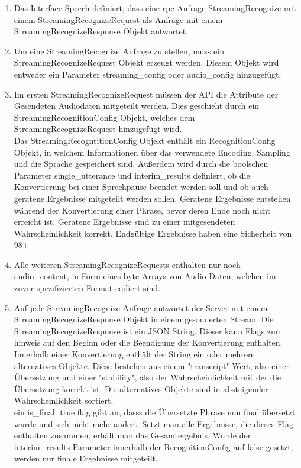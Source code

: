 \begin{enumerate}
	\item Das Interface Speech definiert, dass eine rpc Anfrage StreamingRecognize mit einem StreamingRecognizeRequest als Anfrage mit einem StreamingRecognizeResponse Objekt antwortet.
	\item Um eine StreamingRecognize Anfrage zu stellen, muss ein StreamingRecognizeRequest Objekt erzeugt werden. Diesem Objekt wird entweder ein Parameter streaming\_config oder audio\_config hinzugefügt.
	\item Im ersten StreamingRecognizeRequest müssen der API die Attribute der Gesendeten Audiodaten mitgeteilt werden. Dies geschieht durch ein StreamingRecognitionConfig Objekt, welches dem StreamingRecognizeRequest hinzugefügt wird.\\
	Das StreamingRecogntitionConfig Objekt enthält ein RecognitionConfig Objekt, in welchem Informationen über das verwendete Encoding, Sampling und die Sprache gespeichert sind. Außerdem wird durch die boolschen Parameter single\_utterance und interim\_results definiert, ob die Konvertierung bei einer Sprechpause beendet werden soll und ob auch geratene Ergebnisse mitgeteilt werden sollen. Geratene Ergebnisse entstehen während der Konvertierung einer Phrase, bevor deren Ende noch nicht erreicht ist. Geratene Ergebnisse sind zu einer mitgesendeten Wahrscheinlichkeit korrekt. Endgültige Ergebnisse haben eine Sicherheit von 98+ %
	\item Alle weiteren StreamingRecognizeRequests enthalten nur noch audio\_content, in Form eines byte Arrays von Audio Daten, welchen im zuvor spezifizierten Format codiert sind.
	\item Auf jede StreamingRecognize Anfrage antwortet der Server mit einem StreamingRecognizeResponse Objekt in einem gesonderten Stream. Die StreamingRecognizeResponse ist ein JSON String. Dieser kann Flags zum hinweis auf den Beginn oder die Beendigung der Konvertierung enthalten. Innerhalb einer Konvertierung enthält der String ein oder mehrere alternatives Objekte. Diese bestehen aus einem "transcript"-Wert, also einer Übersetzung und einer "stability", also der Wahrscheinlichkeit mit der die Übersetzung korrekt ist. Die alternatives Objekte sind in absteigender Wahrscheinlichkeit sortiert.\\
	ein is\_final: true flag gibt an, dasss die Übersetzte Phrase nun final übersetzt wurde und sich nicht mehr ändert. Setzt man alle Ergebnisse, die dieses Flag enthalten zusammen, erhält man das Gesamtergebnis. Wurde der interim\_results Parameter innerhalb der RecognitionConfig auf false gesetzt, werden nur finale Ergebnisse mitgeteilt.
\end{enumerate} \cite{google_package_2017}

